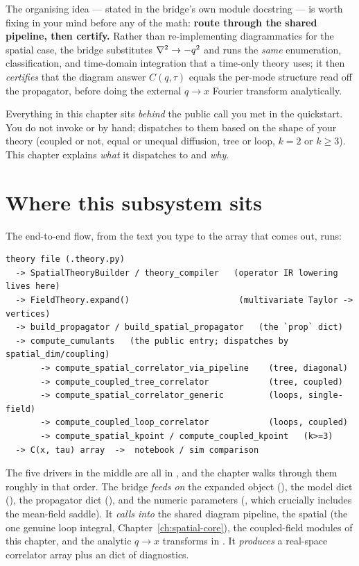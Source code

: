 The organising idea --- stated in the bridge's own module docstring --- is
worth fixing in your mind before any of the math: \textbf{route through the
shared pipeline, then certify.} Rather than re-implementing diagrammatics for
the spatial case, the bridge substitutes $\nabla^2\to-q^{2}$ and runs the
\emph{same} enumeration, classification, and time-domain integration that a
time-only theory uses; it then \emph{certifies} that the diagram answer
$C(q,\tau)$ equals the per-mode structure read off the propagator, before doing
the external $q\to x$ Fourier transform analytically.

\begin{note}
Everything in this chapter sits \emph{behind} the public
 call you met in the quickstart. You do not invoke
 or  by hand;
 dispatches to them based on the shape of your theory
(coupled or not, equal or unequal diffusion, tree or loop, $k=2$ or $k\ge3$).
This chapter explains \emph{what} it dispatches to and \emph{why}.
\end{note}

\section{Where this subsystem sits}

The end-to-end flow, from the text you type to the array that comes out, runs:

\begin{lstlisting}[style=console]
theory file (.theory.py)
  -> SpatialTheoryBuilder / theory_compiler   (operator IR lowering lives here)
  -> FieldTheory.expand()                      (multivariate Taylor -> vertices)
  -> build_propagator / build_spatial_propagator   (the `prop` dict)
  -> compute_cumulants   (the public entry; dispatches by spatial_dim/coupling)
       -> compute_spatial_correlator_via_pipeline    (tree, diagonal)
       -> compute_coupled_tree_correlator            (tree, coupled)
       -> compute_spatial_correlator_generic         (loops, single-field)
       -> compute_coupled_loop_correlator            (loops, coupled)
       -> compute_spatial_kpoint / compute_coupled_kpoint   (k>=3)
  -> C(x, tau) array  ->  notebook / sim comparison
\end{lstlisting}

The five drivers in the middle are all in , and the
chapter walks through them roughly in that order. The bridge \emph{feeds on} the
expanded  object (), the model dict (),
the propagator dict (), and the numeric parameters (,
which crucially includes the mean-field saddle). It \emph{calls into} the shared
diagram pipeline, the spatial  (the one genuine loop
integral, Chapter~\ref{ch:spatial-core}), the coupled-field modules of this
chapter, and the analytic $q\to x$ transforms in . It
\emph{produces} a real-space correlator array  plus an  dict of diagnostics.

